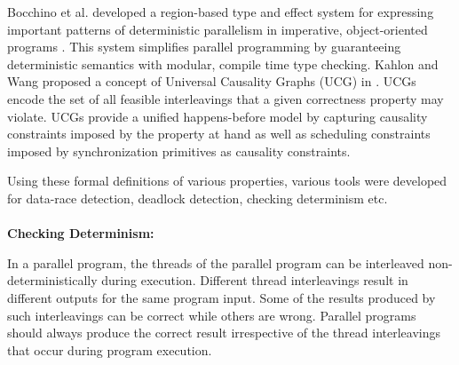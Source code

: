 Bocchino et al. developed a region-based type and effect system for expressing important patterns of deterministic parallelism in imperative, object-oriented programs \cite{bocchino2009type}. This system simplifies parallel programming by guaranteeing deterministic semantics with modular, compile time type checking. Kahlon and Wang proposed a concept of Universal Causality Graphs (UCG) in \cite{kahlon2010universal}. UCGs encode the set of all feasible interleavings that a given correctness property may violate. UCGs provide a unified happens-before model by capturing causality constraints imposed by the property at hand as well as scheduling constraints imposed by synchronization primitives as causality constraints.

Using these formal definitions of various properties, various tools were developed for data-race detection, deadlock detection, checking determinism etc.\\
\\
\textbf{Checking Determinism: }

In a parallel program, the threads of the parallel program can be interleaved non-deterministically during execution. Different thread interleavings result in different outputs for the same program input. Some of the results produced by such interleavings can be correct while others are wrong. Parallel programs should always produce the correct result irrespective of the thread interleavings that occur during program execution.

